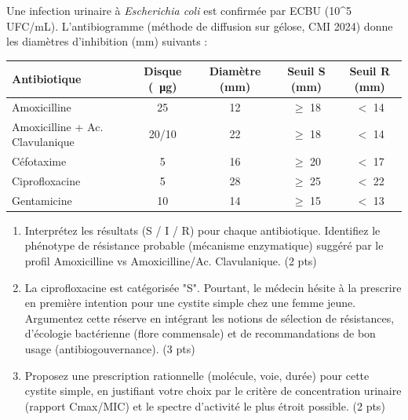 \documentclass[11pt]{article}
\begin{document}
\begin{exercice}
Une infection urinaire à \textit{Escherichia coli} est confirmée par ECBU (\num{10^5} UFC/mL). L'antibiogramme (méthode de diffusion sur gélose, CMI 2024) donne les diamètres d'inhibition (mm) suivants :

\begin{center}
\begin{tabular}{|l|c|c|c|c|}
\hline
\textbf{Antibiotique} & \textbf{Disque (\SI{}{\micro\gram})} & \textbf{Diamètre (mm)} & \textbf{Seuil S (mm)} & \textbf{Seuil R (mm)} \\
\hline
Amoxicilline & 25 & 12 & $\ge$ 18 & $<$ 14 \\
\hline
Amoxicilline + Ac. Clavulanique & 20/10 & 22 & $\ge$ 18 & $<$ 14 \\
\hline
Céfotaxime & 5 & 16 & $\ge$ 20 & $<$ 17 \\
\hline
Ciprofloxacine & 5 & 28 & $\ge$ 25 & $<$ 22 \\
\hline
Gentamicine & 10 & 14 & $\ge$ 15 & $<$ 13 \\
\hline
\end{tabular}
\end{center}

\begin{enumerate}
    \item Interprétez les résultats (S / I / R) pour chaque antibiotique. Identifiez le phénotype de résistance probable (mécanisme enzymatique) suggéré par le profil Amoxicilline vs Amoxicilline/Ac. Clavulanique. (2 pts)
    \item La ciprofloxacine est catégorisée "S". Pourtant, le médecin hésite à la prescrire en première intention pour une cystite simple chez une femme jeune. Argumentez cette réserve en intégrant les notions de sélection de résistances, d'écologie bactérienne (flore commensale) et de recommandations de bon usage (antibiogouvernance). (3 pts)
    \item Proposez une prescription rationnelle (molécule, voie, durée) pour cette cystite simple, en justifiant votre choix par le critère de concentration urinaire (rapport Cmax/MIC) et le spectre d'activité le plus étroit possible. (2 pts)
\end{enumerate}
\end{exercice}
\end{document}
